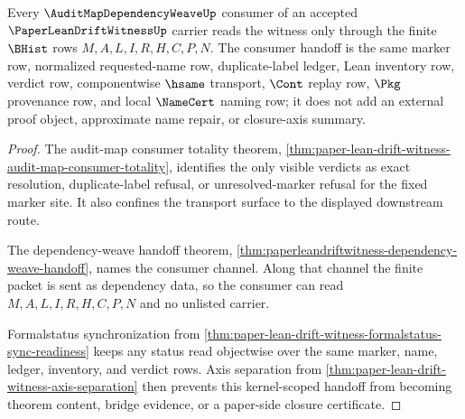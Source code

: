 \begin{theorem}
\label{thm:paperleandriftwitness-audit-consumer-kernel-scope}
Every $\AuditMapDependencyWeaveUp$ consumer of an accepted $\PaperLeanDriftWitnessUp$ carrier reads the witness only through the finite $\BHist$ rows $M,A,L,I,R,H,C,P,N$. The consumer handoff is the same marker row, normalized requested-name row, duplicate-label ledger, Lean inventory row, verdict row, componentwise $\hsame$ transport, $\Cont$ replay row, $\Pkg$ provenance row, and local $\NameCert$ naming row; it does not add an external proof object, approximate name repair, or closure-axis summary.
\end{theorem}
\begin{proof}
The audit-map consumer totality theorem, \autoref{thm:paper-lean-drift-witness-audit-map-consumer-totality}, identifies the only visible verdicts as exact resolution, duplicate-label refusal, or unresolved-marker refusal for the fixed marker site. It also confines the transport surface to the displayed downstream route.

The dependency-weave handoff theorem, \autoref{thm:paperleandriftwitness-dependency-weave-handoff}, names the consumer channel. Along that channel the finite packet is sent as dependency data, so the consumer can read $M,A,L,I,R,H,C,P,N$ and no unlisted carrier.

Formalstatus synchronization from \autoref{thm:paper-lean-drift-witness-formalstatus-sync-readiness} keeps any status read objectwise over the same marker, name, ledger, inventory, and verdict rows. Axis separation from \autoref{thm:paper-lean-drift-witness-axis-separation} then prevents this kernel-scoped handoff from becoming theorem content, bridge evidence, or a paper-side closure certificate.
\end{proof}

